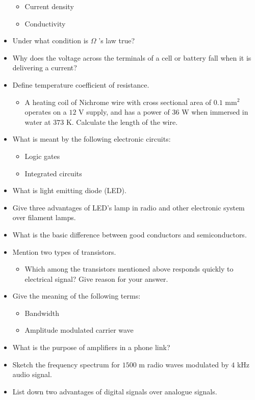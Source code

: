 \documentclass{article}
\begin{document}
\begin{itemize}
 \begin{itemize}
\item Current density
\item Conductivity 
\end{itemize}
\item Under what condition is $ \Omega $ ’s law true?
\item Why does the voltage across the terminals of a cell or battery fall when it is delivering a current? 
\item Define temperature coefficient of resistance.
 \begin{itemize}
\item A heating coil of Nichrome wire with cross sectional area of $ 0.1 $ mm$ ^{2}$ operates on a $ 12$ V supply, and has a power of $ 36$ W when immersed in water at $ 373$ K. Calculate the length of the wire.
\end{itemize}
\item What is meant by the following electronic circuits:
 \begin{itemize}
\item Logic gates 
\item Integrated circuits
\end{itemize}
\item What is light emitting diode (LED).
\item Give three advantages of LED's lamp in radio and other electronic system over filament lamps.
\item What is the basic difference between good conductors and semiconductors.
\item Mention two types of transistors.
 \begin{itemize}
\item Which among the transistors mentioned above responds quickly to electrical signal? Give reason for your answer.
\end{itemize}
\item Give the meaning of the following terms:
 \begin{itemize}
\item Bandwidth
\item  Amplitude modulated carrier wave
\end{itemize}
\item What is the purpose of amplifiers in a phone link? 
\item Sketch the frequency spectrum for $ 1500$ m radio waves modulated by $ 4$ kHz audio signal.
\item List down two advantages of digital signals over analogue signals.

\end{itemize}
\end{document}
